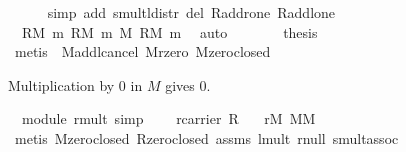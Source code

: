 \begin{isabellebody}
\ \ \ \ \isamarkupfalse%
\ {\isacharparenleft}simp\ add{\isacharcolon}\ smult{\isacharunderscore}l{\isacharunderscore}distr\ del{\isacharcolon}\ R{\isachardot}add{\isachardot}r{\isacharunderscore}one\ R{\isachardot}add{\isachardot}l{\isacharunderscore}one{\isacharparenright}\isanewline
\ \ \isamarkupfalse%
\ {}\ {}\ \isamarkupfalse%
\ {}{\isacharcolon}\ {\isachardoublequoteopen}{\isasymzero}\isactrlbsub R\isactrlesub {\isasymodot}\isactrlbsub M\isactrlesub \ m\ {\isacharequal}{\isacharparenleft}{\isasymzero}\isactrlbsub R\isactrlesub {\isasymodot}\isactrlbsub M\isactrlesub \ m{\isacharparenright}\ {\isasymoplus}\isactrlbsub M\isactrlesub \ {\isacharparenleft}{\isasymzero}\isactrlbsub R\isactrlesub {\isasymodot}\isactrlbsub M\isactrlesub \ m{\isacharparenright}{\isachardoublequoteclose}\ \isamarkupfalse%
\ auto\isanewline
\ \ \isamarkupfalse%
\ {}\ {}\ \isamarkupfalse%
\ {\isacharquery}thesis\ \isamarkupfalse%
\ {\isacharparenleft}metis\ {}\ M{\isachardot}add{\isachardot}l{\isacharunderscore}cancel\ M{\isachardot}r{\isacharunderscore}zero\ M{\isachardot}zero{\isacharunderscore}closed{\isacharparenright}\isanewline
{}\isamarkupfalse%
%
\endisatagproof
{\isafoldproof}%
%
\isadelimproof
%
\endisadelimproof
%
\begin{isamarkuptext}%
Multiplication by 0 in $M$ gives 0.%
\end{isamarkuptext}%
\isamarkuptrue%
\isamarkupfalse%
\ {\isacharparenleft}\ module{\isacharparenright}\ rmult{\isacharunderscore}{}\ {\isacharbrackleft}simp{\isacharbrackright}{\isacharcolon}\isanewline
\ \ \ {}{\isacharcolon}\ {\isachardoublequoteopen}r{\isasymin}carrier\ R{\isachardoublequoteclose}\isanewline
\ \ \ {\isachardoublequoteopen}r{\isasymodot}\isactrlbsub M\isactrlesub \ {\isasymzero}\isactrlbsub M\isactrlesub {\isacharequal}{\isasymzero}\isactrlbsub M\isactrlesub {\isachardoublequoteclose}\isanewline
%
\isadelimproof
%
\endisadelimproof
%
\isatagproof
{}\isamarkupfalse%
\ {\isacharparenleft}metis\ M{\isachardot}zero{\isacharunderscore}closed\ R{\isachardot}zero{\isacharunderscore}closed\ assms\ lmult{\isacharunderscore}{}\ r{\isacharunderscore}null\ smult{\isacharunderscore}assoc{}{\isacharparenright}%
\endisatagproof
{\isafoldproof}%
%
\isadelimproof
%
\endisadelimproof
%
\begin{isamarkuptext}%

\end{isamarkuptext}
\end{isabellebody}
